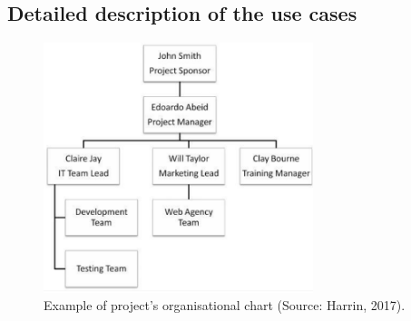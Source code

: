 \documentclass{article}
\begin{document}
\subsection{Detailed description of the use cases}

\label{sec:references}



\begin{figure}[h]
  \centering
  \includegraphics[width=0.7\textwidth]{harrin_2017.png}
  \caption{ Example of project's organisational chart (Source: Harrin, 2017).}
  \label{harrin}
\end{figure}
\end{document}
